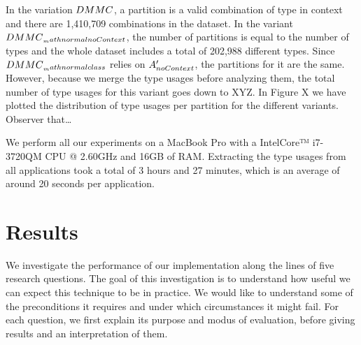 In the variation $\mathnormal{DMMC}$, a partition is a valid combination of type in context and there are 1,410,709 combinations in the dataset.
In the variant $\mathnormal{DMMC}_{_mathnormal{noContext}}$, the number of partitions is equal to the number of types and the whole dataset includes a total of 202,988 different types.
Since $\mathnormal{DMMC}_{_mathnormal{class}}$ relies on $A'_\mathnormal{noContext}$, the partitions for it are the same.
However, because we merge the type usages before analyzing them, the total number of type usages for this variant goes down to XYZ.
In Figure X we have plotted the distribution of type usages per partition for the different variants.
Observer that\ldots 
{}

We perform all our experiments on a MacBook Pro with a Intel\textregistered Core™ i7-3720QM CPU @ 2.60GHz and 16GB of RAM.
Extracting the type usages from all applications took a total of 3 hours and 27 minutes, which is an average of around 20 seconds per application.


\section{Results}


We investigate the performance of our implementation along the lines of five research questions.
The goal of this investigation is to understand how useful we can expect this technique to be in practice.
We would like to understand some of the preconditions it requires and under which circumstances it might fail.
For each question, we first explain its purpose and modus of evaluation, before giving results and an interpretation of them.

